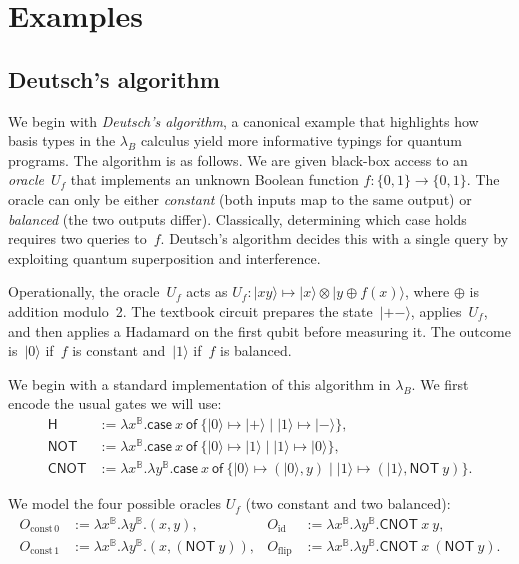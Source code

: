 \documentclass[runningheads,orivec,envcountsame,envcountsect]{llncs}
\providecommand{\qed}{\hbox{\rule{1ex}{1ex}}}%
\newcommand\ket[1]{\ensuremath{|#1\rangle}}
\def\Pair#1#2{(#1,#2)} %
\def\Lam#1#2#3{\lambda#1^{#2}{.}#3} %
\def\case#1#2#3#4#5{\ensuremath{\mathsf{case}~#1~\mathsf{of}~\{#2\mapsto #4 \mid #3\mapsto #5\}}}
\def\TYP#1#2#3{#1~{\vdash}~#2~{:}~#3}
\newcommand\B{\mathbb B}
\newcommand\Hd{\mathsf{H}}
\newcommand{\cnot}[2]{\mathsf{CNOT}\ #1\ #2}
\newcommand{\pauliX}[1]{\mathsf{NOT}\ #1}
\newcommand{\lambdaB}{\lambda_B}
\begin{document}

\section{Examples}\label{sec:examples}
\subsection{Deutsch's algorithm}\label{subsec:deutsch}
We begin with \emph{Deutsch's algorithm}, a canonical example that highlights
how basis types in the $\lambdaB$ calculus yield more informative typings for
quantum programs.
The algorithm is as follows.
We are given black-box access to an \emph{oracle}~$U_f$ that implements an
unknown Boolean function $f:\{0,1\}\to\{0,1\}$.  
The oracle can only be either \emph{constant} (both inputs map to the same
output) or \emph{balanced} (the two outputs differ).  
Classically, determining which case holds requires two queries to~$f$.  
Deutsch's algorithm decides this with a single query by exploiting quantum
superposition and interference.

Operationally, the oracle~$U_f$ acts as
\(
  U_f:\ket{xy}\mapsto \ket{x}\otimes\ket{y\oplus f(x)}
\),
where $\oplus$ is addition modulo~2.  
The textbook circuit prepares the state~$\ket{+-}$, applies~$U_f$, and
then applies a Hadamard on the first qubit before measuring it.  
The outcome is~$\ket{0}$ if~$f$ is constant and~$\ket{1}$ if~$f$ is balanced.

We begin with a standard implementation of this algorithm in $\lambdaB$.
We first encode the usual gates we will use:
\begin{align*}
  \Hd &:= \Lam{x}{\B}{\case{x}{\ket{0}}{\ket{1}}{\ket{+}}{\ket{-}}},\\
  \mathsf{NOT} &:= \Lam{x}{\B}{\case{x}{\ket{0}}{\ket{1}}{\ket{1}}{\ket{0}}},\\
  \mathsf{CNOT} &:= \Lam{x}{\B}{\Lam{y}{\B}{
    \case{x}{\ket{0}}{\ket{1}}
      {\Pair{\ket{0}}{y}}
      {\Pair{\ket{1}}{\pauliX{y}}}}}.
\end{align*}

We model the four possible oracles $U_f$ (two constant and two balanced):
\begin{align*}
  O_{\mathrm{const}\,0} &:= \Lam{x}{\B}{\Lam{y}{\B}{\Pair{x}{y}}},
  & O_{\mathrm{id}}       &:= \Lam{x}{\B}{\Lam{y}{\B}{\cnot{x}{y}}},\\
  O_{\mathrm{const}\,1} &:= \Lam{x}{\B}{\Lam{y}{\B}{\Pair{x}{(\pauliX{y})}}},
  & O_{\mathrm{flip}}     &:= \Lam{x}{\B}{\Lam{y}{\B}{\cnot{x}{(\pauliX{y})}}}.
\end{align*}
\end{document}
